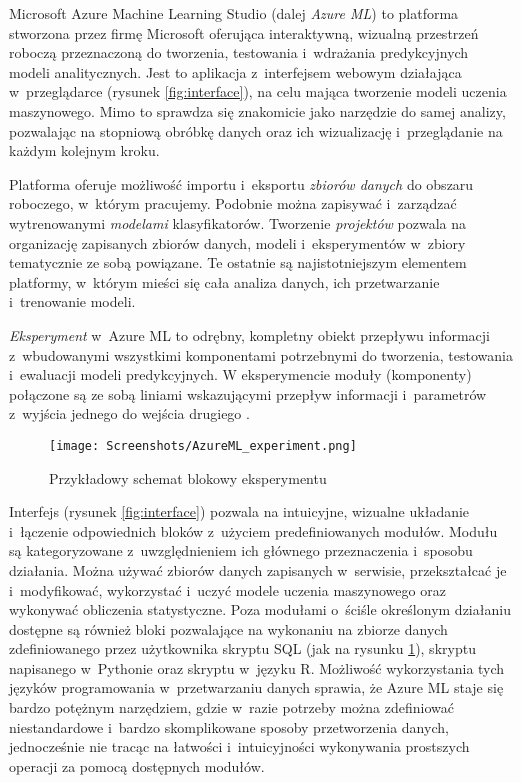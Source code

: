 Microsoft Azure Machine Learning Studio (dalej \emph{Azure ML}) to platforma stworzona przez firmę Microsoft oferująca interaktywną, wizualną przestrzeń roboczą przeznaczoną do tworzenia, testowania i~wdrażania predykcyjnych modeli analitycznych.
Jest to aplikacja z~interfejsem webowym działająca w~przeglądarce (rysunek \ref{fig:interface}), na celu mająca tworzenie modeli uczenia maszynowego.
Mimo to sprawdza się znakomicie jako narzędzie do samej analizy, pozwalając na stopniową obróbkę danych oraz ich wizualizację i~przeglądanie na każdym kolejnym kroku.

Platforma oferuje możliwość importu i~eksportu \emph{zbiorów danych} do obszaru roboczego, w~którym pracujemy.
Podobnie można zapisywać i~zarządzać wytrenowanymi \emph{modelami} klasyfikatorów.
Tworzenie \emph{projektów} pozwala na organizację zapisanych zbiorów danych, modeli i~eksperymentów w~zbiory tematycznie ze sobą powiązane.
Te ostatnie są najistotniejszym elementem platformy, w~którym mieści się cała analiza danych, ich przetwarzanie i~trenowanie modeli.

\emph{Eksperyment} w~Azure ML to odrębny, kompletny obiekt przepływu informacji z~wbudowanymi wszystkimi komponentami potrzebnymi do tworzenia, testowania i~ewaluacji modeli predykcyjnych.
W eksperymencie moduły (komponenty) połączone są ze sobą liniami wskazującymi przepływ informacji i~parametrów z~wyjścia jednego do wejścia drugiego \cite{barga2015introducing}.

\begin{figure}[ht]
	\texttt{[image: Screenshots/AzureML\_experiment.png]}
	\caption{Przykładowy schemat blokowy eksperymentu}
	\label{fig:experiment}
\end{figure}

Interfejs (rysunek \ref{fig:interface}) pozwala na intuicyjne, wizualne układanie i~łączenie odpowiednich bloków z~użyciem predefiniowanych modułów.
Modułu są kategoryzowane z~uwzględnieniem ich głównego przeznaczenia i~sposobu działania.
Można używać zbiorów danych zapisanych w~serwisie, przekształcać je i~modyfikować, wykorzystać i~uczyć modele uczenia maszynowego oraz wykonywać obliczenia statystyczne.
Poza modułami o~ściśle określonym działaniu dostępne są również bloki pozwalające na wykonaniu na zbiorze danych zdefiniowanego przez użytkownika skryptu SQL (jak na rysunku \ref{fig:experiment}), skryptu napisanego w~Pythonie oraz skryptu w~języku R.
Możliwość wykorzystania tych języków programowania w~przetwarzaniu danych sprawia, że Azure ML staje się bardzo potężnym narzędziem, gdzie w~razie potrzeby można zdefiniować niestandardowe i~bardzo skomplikowane sposoby przetworzenia danych, jednocześnie nie tracąc na łatwości i~intuicyjności wykonywania prostszych operacji za pomocą dostępnych modułów.

